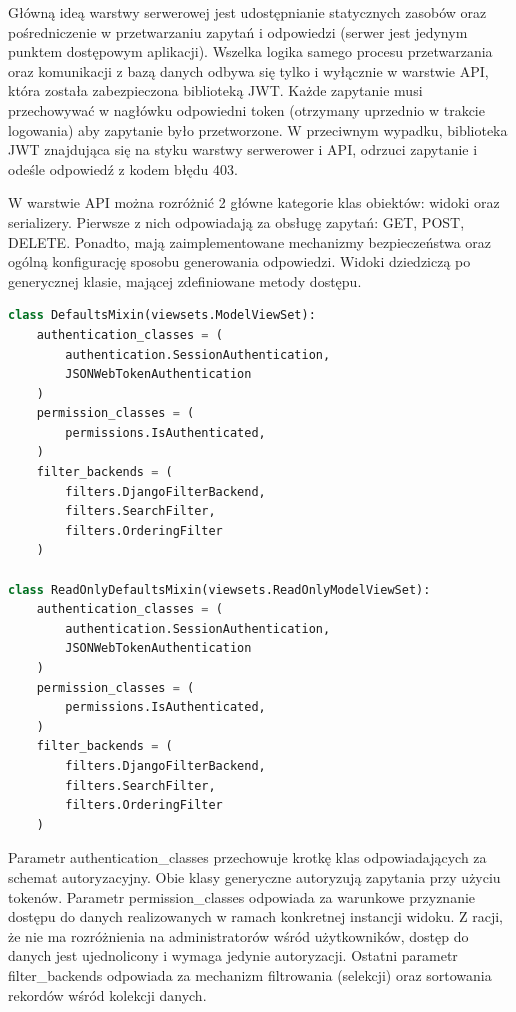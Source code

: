 \documentclass[a4paper,onecolumn,oneside,12pt]{memoir}
\begin{document}
{Główną ideą warstwy serwerowej jest udostępnianie statycznych zasobów oraz pośredniczenie w przetwarzaniu
zapytań i odpowiedzi (serwer jest jedynym punktem dostępowym aplikacji). Wszelka logika samego procesu przetwarzania
oraz komunikacji z bazą danych odbywa się tylko i wyłącznie w warstwie API, która została zabezpieczona biblioteką JWT.
Każde zapytanie musi przechowywać w nagłówku odpowiedni token (otrzymany uprzednio w trakcie logowania) aby zapytanie
było przetworzone. W przeciwnym wypadku, biblioteka JWT znajdująca się na styku warstwy serwerower i API, odrzuci
zapytanie i odeśle odpowiedź z kodem błędu 403.

W warstwie API można rozróżnić 2 główne kategorie klas obiektów: widoki oraz serializery.
Pierwsze z nich odpowiadają za obsługę zapytań: GET, POST, DELETE. Ponadto, mają zaimplementowane
mechanizmy bezpieczeństwa oraz ogólną konfigurację sposobu generowania odpowiedzi.
Widoki dziedziczą po generycznej klasie, mającej zdefiniowane metody dostępu.

\begin{lstlisting}[language=Python, caption=Generyczne klasy widoków API]
class DefaultsMixin(viewsets.ModelViewSet):
    authentication_classes = (
        authentication.SessionAuthentication,
        JSONWebTokenAuthentication
    )
    permission_classes = (
        permissions.IsAuthenticated,
    )
    filter_backends = (
		filters.DjangoFilterBackend,
		filters.SearchFilter,
		filters.OrderingFilter
	)

class ReadOnlyDefaultsMixin(viewsets.ReadOnlyModelViewSet):
    authentication_classes = (
        authentication.SessionAuthentication,
        JSONWebTokenAuthentication
    )
    permission_classes = (
        permissions.IsAuthenticated,
    )
    filter_backends = (
		filters.DjangoFilterBackend,
		filters.SearchFilter,
		filters.OrderingFilter
	)
\end{lstlisting}

Parametr authentication\_classes przechowuje krotkę klas odpowiadających za schemat autoryzacyjny.
Obie klasy generyczne autoryzują zapytania przy użyciu tokenów. Parametr permission\_classes
odpowiada za warunkowe przyznanie dostępu do danych realizowanych w ramach konkretnej
instancji widoku. Z racji, że nie ma rozróżnienia na administratorów wśród użytkowników,
dostęp do danych jest ujednolicony i wymaga jedynie autoryzacji. Ostatni parametr
filter\_backends odpowiada za mechanizm filtrowania (selekcji) oraz sortowania rekordów
wśród kolekcji danych.

}
\end{document}
